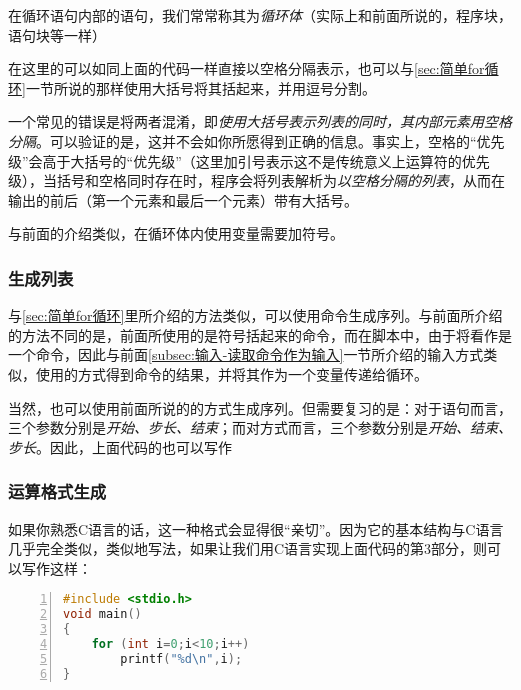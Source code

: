 \begin{extend}
    在循环语句内部的语句，我们常常称其为\emph{循环体}（实际上和前面所说的，程序块，语句块等一样）
\end{extend}

在这里的可以如同上面的代码一样直接以空格分隔表示，也可以与\ref{sec:简单for循环}一节所说的那样使用大括号将其括起来，并用逗号分割。

\begin{attention}
    一个常见的错误是将两者混淆，即\emph{使用大括号表示列表的同时，其内部元素用空格分隔}。可以验证的是，这并不会如你所愿得到正确的信息。事实上，空格的“优先级”会高于大括号的“优先级”（这里加引号表示这不是传统意义上运算符的优先级），当括号和空格同时存在时，程序会将列表解析为\emph{以空格分隔的列表}，从而在输出的前后（第一个元素和最后一个元素）带有大括号。
\end{attention}

与前面的介绍类似，在循环体内使用变量需要加\code{\$}符号。

\subsubsection{生成列表}

与\ref{sec:简单for循环}里所介绍的方法类似，可以使用命令生成序列。与前面所介绍的方法不同的是，前面所使用的是符号括起来的命令，而在脚本中，由于将看作是一个命令，因此与前面\ref{subsec:输入-读取命令作为输入}一节所介绍的输入方式类似，使用\code{\$()}的方式得到命令的结果，并将其作为一个变量传递给循环。

当然，也可以使用前面所说的的方式生成序列。但需要复习的是：对于语句而言，三个参数分别是\emph{开始、步长、结束}；而对方式而言，三个参数分别是\emph{开始、结束、步长}。因此，上面代码的也可以写作

\subsubsection{运算格式生成}

如果你熟悉C语言的话，这一种格式会显得很“亲切”。因为它的基本结构与C语言几乎完全类似，类似地写法，如果让我们用C语言实现上面代码的第3部分，则可以写作这样：

\begin{lstlisting}[language=C,numbers=left]
#include <stdio.h>
void main()
{
    for (int i=0;i<10;i++)
        printf("%d\n",i);
}
\end{lstlisting}

